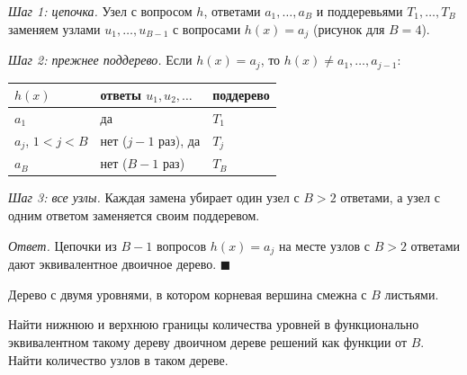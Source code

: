 \documentclass[12pt,a4paper]{article}
\begin{document}
\emph{Шаг 1: цепочка.} Узел с вопросом $h$, ответами $a_1, \dots, a_B$ и
поддеревьями $T_1, \dots, T_B$ заменяем узлами $u_1, \dots, u_{B-1}$ с вопросами
$h(x) = a_j$ (рисунок для $B = 4$).
\begin{center}
\end{center}

\emph{Шаг 2: прежнее поддерево.} Если $h(x) = a_j$, то $h(x) \ne a_1, \dots, a_{j-1}$:
\begin{center}
\begin{tabular}{lll}
\toprule
$h(x)$ & ответы $u_1, u_2, \dots$ & поддерево \\
\midrule
$a_1$ & да & $T_1$ \\
$a_j$, $1 < j < B$ & нет ($j - 1$ раз), да & $T_j$ \\
$a_B$ & нет ($B - 1$ раз) & $T_B$ \\
\bottomrule
\end{tabular}
\end{center}

\emph{Шаг 3: все узлы.} Каждая замена убирает один узел с $B > 2$ ответами, а узел с
одним ответом заменяется своим поддеревом.

\emph{Ответ.} Цепочки из $B - 1$ вопросов $h(x) = a_j$ на месте узлов с $B > 2$
ответами дают эквивалентное двоичное дерево. $\blacksquare$

\dano Дерево с двумя уровнями, в котором корневая вершина смежна с $B$ листьями.

\treb Найти нижнюю и верхнюю границы количества уровней в функционально эквивалентном
такому дереву двоичном дереве решений как функции от $B$. Найти количество узлов в
таком дереве.
\end{document}

